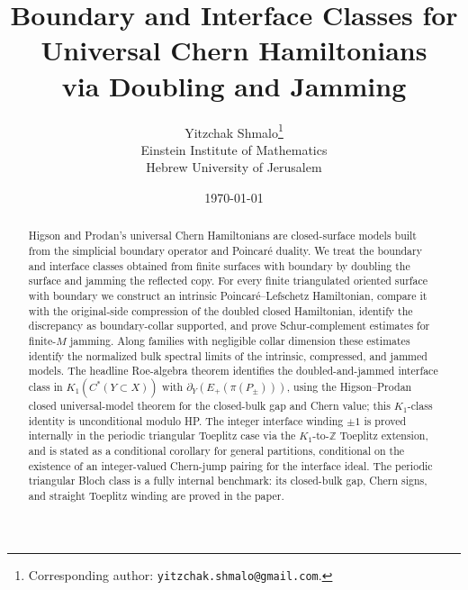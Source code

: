 \documentclass[11pt]{article}
\title{Boundary and Interface Classes for Universal Chern Hamiltonians\\
via Doubling and Jamming}
\author{
Yitzchak Shmalo\thanks{Corresponding author: \texttt{yitzchak.shmalo@gmail.com}.}\\[0.6em]
Einstein Institute of Mathematics\\
Hebrew University of Jerusalem
}
\date{\today}
\numberwithin{equation}{section}
\theoremstyle{definition}
\theoremstyle{remark}
\begin{document}
\maketitle

\begin{abstract}
Higson and Prodan's universal Chern Hamiltonians are closed-surface models built from the
simplicial boundary operator and Poincar\'e duality. We treat the boundary and interface classes
obtained from finite surfaces with boundary by doubling the surface and jamming the reflected copy.
For every finite triangulated oriented surface with boundary we construct an intrinsic
Poincar\'e--Lefschetz Hamiltonian, compare it with the original-side compression of the doubled
closed Hamiltonian, identify the discrepancy as boundary-collar supported, and prove
Schur-complement estimates for finite-\(M\) jamming. Along families with negligible collar
dimension these estimates identify the normalized bulk spectral limits of the intrinsic,
compressed, and jammed models. The headline Roe-algebra theorem identifies the doubled-and-jammed
interface class in \(K_1(C^*(Y\subset X))\) with
\(\partial_Y(E_+(\pi(P_\pm)))\), using the Higson--Prodan closed universal-model theorem
\cite{HigsonProdanUniversalPRL,HigsonProdanUniversalArxiv} for the closed-bulk gap and Chern
value; this \(K_1\)-class identity is unconditional modulo HP. The integer interface winding
\(\pm1\) is proved internally in the periodic triangular Toeplitz case via the
\(K_1\)-to-\(\mathbb Z\) Toeplitz extension, and is stated as a conditional corollary for
general partitions, conditional on the existence of an integer-valued Chern-jump pairing for
the interface ideal. The periodic triangular Bloch class is a fully internal benchmark: its
closed-bulk gap, Chern signs, and straight Toeplitz winding are proved in the paper.


\end{abstract}
\end{document}
